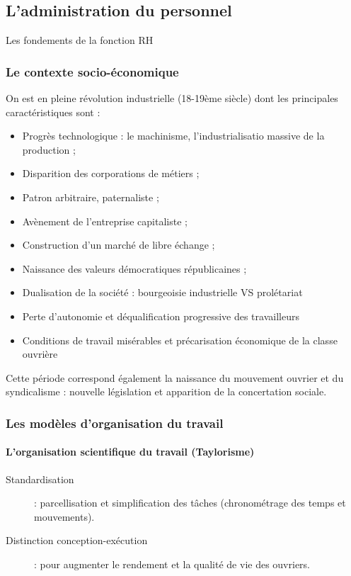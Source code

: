 \documentclass[12pt]{article}
\begin{document}
	\subsection{L'administration du personnel}
	Les fondements de la fonction RH
	  \subsubsection{Le contexte socio-économique}
	  On est en pleine révolution industrielle (18-19ème siècle) dont les principales caractéristiques sont :
	  
	  \begin{itemize}
	   \item Progrès technologique : le machinisme, l'industrialisatio massive de la production ;
	   \item Disparition des corporations de métiers ;
	   \item Patron arbitraire, paternaliste ;
	   \item Avènement de l'entreprise capitaliste ;
	   \item Construction d'un marché de libre échange ;
	   \item Naissance des valeurs démocratiques républicaines ;
	   \item Dualisation de la société : bourgeoisie industrielle VS prolétariat
	   \item Perte d'autonomie et déqualification progressive des travailleurs
	   \item Conditions de travail misérables et précarisation économique de la classe ouvrière
	  \end{itemize}
	  
	  Cette période correspond également la naissance du mouvement ouvrier et du syndicalisme : nouvelle législation et apparition de la concertation sociale.

	  \subsubsection{Les modèles d'organisation du travail}
	  
	  \paragraph{L'organisation scientifique du travail (Taylorisme)}
	  \begin{description}
	   \item[Standardisation] : parcellisation et simplification des tâches (chronométrage des temps et mouvements).
	   \item[Distinction conception-exécution] : pour augmenter le rendement et la qualité de vie des ouvriers.
	  \end{description}
	  
\end{document}
